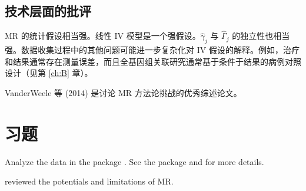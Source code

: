 \subsection{技术层面的批评}\label{sec:25-technical-critiques}

MR 的统计假设相当强。线性 IV 模型是一个强假设。$\hat\gamma_j$ 与 $\hat\Gamma_j$ 的独立性也相当强。数据收集过程中的其他问题可能进一步复杂化对 IV 假设的解释。例如，治疗和结果通常存在测量误差，而且全基因组关联研究通常基于条件于结果的病例对照设计（见第 \ref{ch:B} 章）。

VanderWeele 等 (2014) 是讨论 MR 方法论挑战的优秀综述论文。

\section{习题}\label{sec:25-homework}

\begin{HomeworkProblem}\label{exr:25-1}
Analyze the  data in the  package . See the package and \citet[][Section 7.2]{zhao2020statistical} for more details.



\end{HomeworkProblem}

\begin{HomeworkProblem}\label{exr:25-2}

\citet{davey2003mendelian} reviewed the potentials and limitations of MR.





\end{HomeworkProblem}
